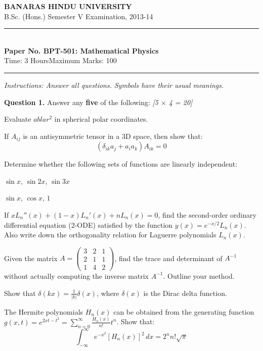\documentclass[11pt,a4paper]{article}
\newcommand{\pts}[1]{\hfill   \textit{[#1]}}
\begin{document}
\begin{center}
  {\large\bfseries BANARAS HINDU UNIVERSITY}\\[2pt]
  {\normalsize B.Sc. (Hons.) Semester V Examination, 2013-14}\\[6pt]
  \rule{0.8\linewidth}{0.5pt}\\[6pt]
  {\large\bfseries Paper No. BPT-501: Mathematical Physics}\\[4pt]
  {\normalsize Time: 3 Hours\hfill Maximum Marks: 100}
\end{center}
\rule{\linewidth}{0.4pt}
\smallskip



\noindent   \textit{Instructions: Answer all questions. Symbols have their usual meanings.}
\bigskip




\noindent   \textbf{Question 1.} Answer any   \textbf{five} of the following: \pts{5 $ \times$ 4 = 20}

\begin{parts}
  \item Evaluate $
abla r^2$ in spherical polar coordinates.
  \item If $A_{ij}$ is an antisymmetric tensor in a 3D space, then show that:
    \[ (\delta_{ik} a_j + a_i a_k) A_{ik} = 0 \]
  \item Determine whether the following sets of functions are linearly independent:
    
\begin{parts}
      \item $\sin x$, $\sin 2x$, $\sin 3x$
      \item $\sin x$, $\cos x$, $1$
    \end{parts}
  \item If $x L_n''(x) + (1-x) L_n'(x) + n L_n(x) = 0$, find the second-order ordinary differential equation (2-ODE) satisfied by the function $y(x) = e^{-x/2} L_n(x)$. Also write down the orthogonality relation for Laguerre polynomials $L_n(x)$.
  \item Given the matrix $A = 
\begin{pmatrix} 3 & 2 & 1 \\ 2 & 1 & 1 \\ 1 & 4 & 2 \end{pmatrix}$, find the trace and determinant of $A^{-1}$ without actually computing the inverse matrix $A^{-1}$. Outline your method.
  \item Show that $\delta(kx) = \frac{1}{|k|} \delta(x)$, where $\delta(x)$ is the Dirac delta function.
  \item The Hermite polynomials $H_n(x)$ can be obtained from the generating function $g(x,t) = e^{2xt-t^2} = \sum_{n=0}^{\infty} \frac{H_n(x)}{n!} t^n$. Show that:
    \[ \int_{-\infty}^{\infty} e^{-x^2} [H_n(x)]^2 \, dx = 2^n n! \sqrt{\pi} \]
\end{parts}
\end{document}
